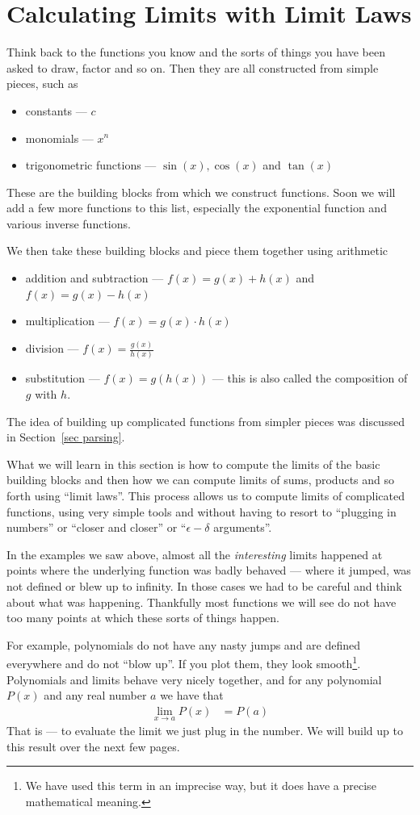 \section{Calculating Limits with Limit Laws}\label{sec_1_4}
Think back to the functions you know and the sorts of things you have  been
asked to draw, factor and so on. Then they are all constructed from simple
pieces, such as
\begin{itemize}
 \item constants --- $c$
 \item monomials --- $x^n$
 \item trigonometric functions --- $\sin(x), \cos(x)$ and $\tan(x)$
\end{itemize}
These are the building blocks from which we construct functions. Soon we will
add a few more functions to this list, especially the exponential function and
various inverse functions.

We then take these building blocks and piece them together using arithmetic
\begin{itemize}
 \item addition and subtraction --- $f(x)  = g(x) + h(x)$ and $f(x) = g(x) -
h(x)$
 \item multiplication --- $f(x) = g(x) \cdot h(x)$
 \item division --- $f(x) = \frac{g(x)}{h(x)}$
 \item substitution --- $f(x) = g( h(x) )$ --- this is also called
the composition of $g$ with $h$.
\end{itemize}
The idea of building up complicated functions from simpler pieces was discussed
in Section~\ref{sec parsing}.

What we will learn in this section is how to compute the limits of the basic
building blocks and then how we can compute limits of sums, products and so
forth using ``limit laws''. This process allows us to compute limits of
complicated functions, using very simple tools and without having to resort to
``plugging in numbers'' or ``closer and closer'' or ``$\epsilon-\delta$
arguments''.


In the examples we saw above, almost all the \emph{interesting} limits happened
at points where the underlying function was badly behaved --- where it jumped,
was not defined or blew up to infinity. In those cases we had to be careful and
think about what was happening. Thankfully most functions we will see do not
have too many points at which these sorts of things happen.

For example, polynomials do not have any nasty jumps and are defined everywhere
and do not ``blow up''. If you plot them, they look smooth\footnote{We have
used this term in an imprecise way, but it does have a precise
mathematical meaning.}. Polynomials and limits behave very nicely together,
and for any polynomial $P(x)$ and any real number $a$ we have that
\begin{align*}
  \lim_{x \to a} P(x) &= P(a)
\end{align*}
That is --- to evaluate the limit we just plug in the number. We will build up
to this result over the next few pages.

